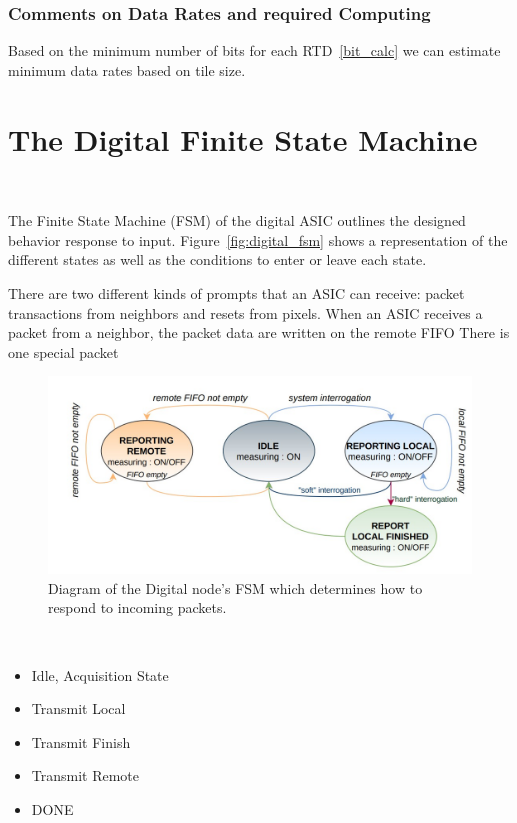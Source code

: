 \subsubsection{Comments on Data Rates and required Computing}

Based on the minimum number of bits for each RTD~\ref{bit_calc} we can estimate minimum data rates based on tile size.


\section{The Digital Finite State Machine}~\label{sec:digital_fsm}

The Finite State Machine (FSM) of the digital ASIC outlines the designed behavior response to input.
Figure~\ref{fig:digital_fsm} shows a representation of the different states as well as the conditions to enter or leave each state.

There are two different kinds of prompts that an ASIC can receive: packet transactions from neighbors and resets from pixels.
When an ASIC receives a packet from a neighbor, the packet data are written on the remote FIFO
There is one special packet


\begin{figure}[]
\centering
\includegraphics[width=\textwidth]{images/digital_fsm_overview.jpg}
\caption{Diagram of the Digital node's FSM which determines how to respond to incoming packets.}
\end{figure}~\label{fig:digital_fsm}

\begin{itemize}
    \item Idle, Acquisition State
    \item Transmit Local
    \item Transmit Finish
    \item Transmit Remote
    \item DONE
\end{itemize}~\label{fsm_state_labels}

